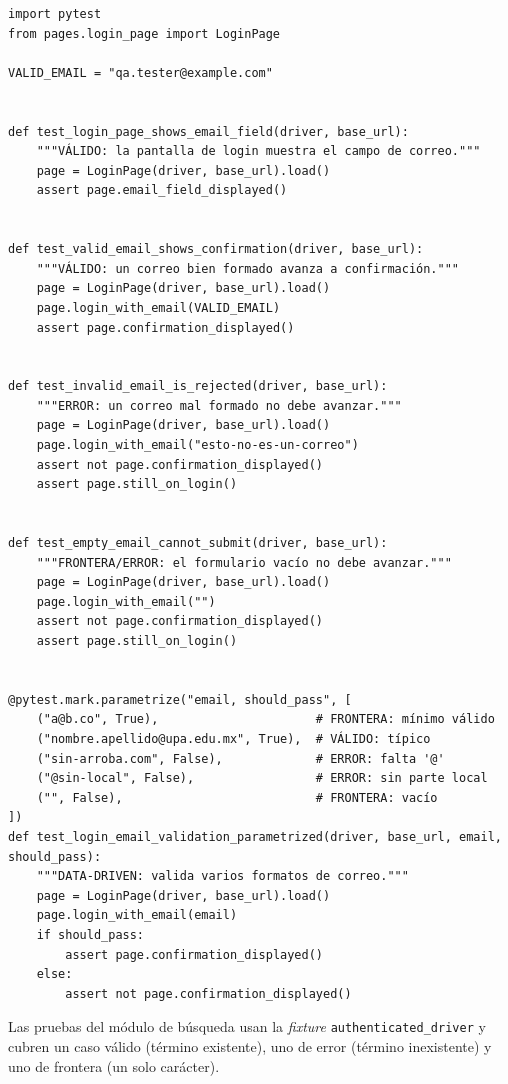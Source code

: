 \documentclass[12pt]{article}
\begin{document}
\begin{lstlisting}[style=py,caption={\texttt{tests/test\_login.py} --- pruebas de autenticación.},captionpos=b]
import pytest
from pages.login_page import LoginPage

VALID_EMAIL = "qa.tester@example.com"


def test_login_page_shows_email_field(driver, base_url):
    """VÁLIDO: la pantalla de login muestra el campo de correo."""
    page = LoginPage(driver, base_url).load()
    assert page.email_field_displayed()


def test_valid_email_shows_confirmation(driver, base_url):
    """VÁLIDO: un correo bien formado avanza a confirmación."""
    page = LoginPage(driver, base_url).load()
    page.login_with_email(VALID_EMAIL)
    assert page.confirmation_displayed()


def test_invalid_email_is_rejected(driver, base_url):
    """ERROR: un correo mal formado no debe avanzar."""
    page = LoginPage(driver, base_url).load()
    page.login_with_email("esto-no-es-un-correo")
    assert not page.confirmation_displayed()
    assert page.still_on_login()


def test_empty_email_cannot_submit(driver, base_url):
    """FRONTERA/ERROR: el formulario vacío no debe avanzar."""
    page = LoginPage(driver, base_url).load()
    page.login_with_email("")
    assert not page.confirmation_displayed()
    assert page.still_on_login()


@pytest.mark.parametrize("email, should_pass", [
    ("a@b.co", True),                      # FRONTERA: mínimo válido
    ("nombre.apellido@upa.edu.mx", True),  # VÁLIDO: típico
    ("sin-arroba.com", False),             # ERROR: falta '@'
    ("@sin-local", False),                 # ERROR: sin parte local
    ("", False),                           # FRONTERA: vacío
])
def test_login_email_validation_parametrized(driver, base_url, email, should_pass):
    """DATA-DRIVEN: valida varios formatos de correo."""
    page = LoginPage(driver, base_url).load()
    page.login_with_email(email)
    if should_pass:
        assert page.confirmation_displayed()
    else:
        assert not page.confirmation_displayed()
\end{lstlisting}

Las pruebas del módulo de búsqueda usan la \textit{fixture}
\texttt{authenticated\_driver} y cubren un caso válido (término existente), uno
de error (término inexistente) y uno de frontera (un solo carácter).
\end{document}
